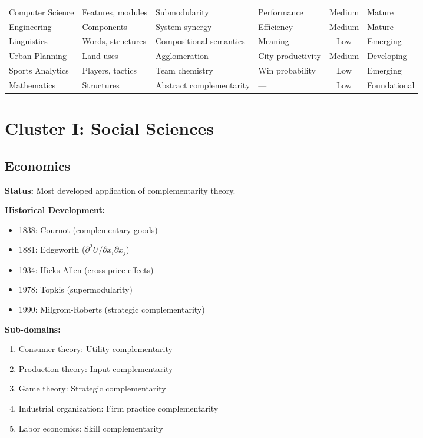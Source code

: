 \begin{table}[htbp]
\begin{tabular}{@{}p{2.2cm}p{2.5cm}p{2.8cm}p{2cm}cp{2cm}@{}}
Computer Science & Features, modules & Submodularity & Performance & Medium & Mature \\
Engineering & Components & System synergy & Efficiency & Medium & Mature \\
Linguistics & Words, structures & Compositional semantics & Meaning & Low & Emerging \\
Urban Planning & Land uses & Agglomeration & City productivity & Medium & Developing \\
Sports Analytics & Players, tactics & Team chemistry & Win probability & Low & Emerging \\
Mathematics & Structures & Abstract complementarity & --- & Low & Foundational \\
\bottomrule
\end{tabular}
\end{table}

\section{Cluster I: Social Sciences}
\label{sec:social}

\subsection{Economics}
\label{sec:econ}

\begin{tcolorbox}[colback=green!5!white,colframe=green!75!black,title=\textbf{Economics: The Origin Domain}]

\textbf{Status:} Most developed application of complementarity theory.

\textbf{Historical Development:}
\begin{itemize}[noitemsep]
    \item 1838: Cournot (complementary goods)
    \item 1881: Edgeworth ($\partial^2 U / \partial x_i \partial x_j$)
    \item 1934: Hicks-Allen (cross-price effects)
    \item 1978: Topkis (supermodularity)
    \item 1990: Milgrom-Roberts (strategic complementarity)
\end{itemize}

\textbf{Sub-domains:}
\begin{enumerate}[noitemsep]
    \item Consumer theory: Utility complementarity
    \item Production theory: Input complementarity
    \item Game theory: Strategic complementarity
    \item Industrial organization: Firm practice complementarity
    \item Labor economics: Skill complementarity
\end{enumerate}

\end{tcolorbox}

